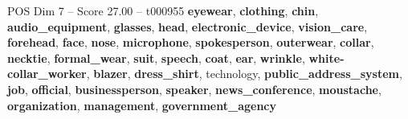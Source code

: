 \begin{textsample}{POS Dim 7 – Score 27.00 – t000955}  \label{ex:f7_pos_031}
\textbf{eyewear}, \textbf{clothing}, \textbf{chin}, \textbf{audio\_equipment}, \textbf{glasses}, \textbf{head}, \textbf{electronic\_device}, \textbf{vision\_care}, \textbf{forehead}, \textbf{face}, \textbf{nose}, \textbf{microphone}, \textbf{spokesperson}, \textbf{outerwear}, \textbf{collar}, \textbf{necktie}, \textbf{formal\_wear}, \textbf{suit}, \textbf{speech}, \textbf{coat}, \textbf{ear}, \textbf{wrinkle}, \textbf{white-collar\_worker}, \textbf{blazer}, \textbf{dress\_shirt}, technology, \textbf{public\_address\_system}, \textbf{job}, \textbf{official}, \textbf{businessperson}, \textbf{speaker}, \textbf{news\_conference}, \textbf{moustache}, \textbf{organization}, \textbf{management}, \textbf{government\_agency}

\end{textsample}
